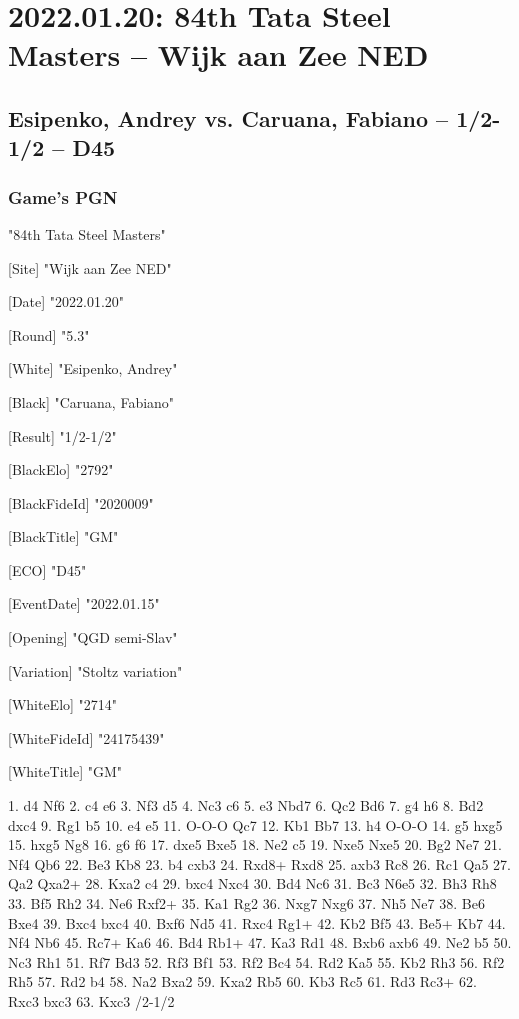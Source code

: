 \documentclass[9pt]{extarticle}
\begin{document}
\section*{2022.01.20: 84th Tata Steel Masters -- Wijk aan Zee NED}

\subsection*{Esipenko, Andrey vs. Caruana, Fabiano -- 1/2-1/2 -- D45}
\subsubsection*{Game's PGN}
\begin{flushleft}
[Event] "84th Tata Steel Masters"

[Site] "Wijk aan Zee NED"

[Date] "2022.01.20"

[Round] "5.3"

[White] "Esipenko, Andrey"

[Black] "Caruana, Fabiano"

[Result] "1/2-1/2"

[BlackElo] "2792"

[BlackFideId] "2020009"

[BlackTitle] "GM"

[ECO] "D45"

[EventDate] "2022.01.15"

[Opening] "QGD semi-Slav"

[Variation] "Stoltz variation"

[WhiteElo] "2714"

[WhiteFideId] "24175439"

[WhiteTitle] "GM"

\end{flushleft}
\begin{flushleft}
1. d4 Nf6 2. c4 e6 3. Nf3 d5 4. Nc3 c6 5. e3 Nbd7 6. Qc2 Bd6 7. g4 h6 8. Bd2 dxc4 9. Rg1 b5 10. e4 e5 11. O-O-O Qc7 12. Kb1 Bb7 13. h4 O-O-O 14. g5 hxg5 15. hxg5 Ng8 16. g6 f6 17. dxe5 Bxe5 18. Ne2 c5 19. Nxe5 Nxe5 20. Bg2 Ne7 21. Nf4 Qb6 22. Be3 Kb8 23. b4 cxb3 24. Rxd8+ Rxd8 25. axb3 Rc8 26. Rc1 Qa5 27. Qa2 Qxa2+ 28. Kxa2 c4 29. bxc4 Nxc4 30. Bd4 Nc6 31. Bc3 N6e5 32. Bh3 Rh8 33. Bf5 Rh2 34. Ne6 Rxf2+ 35. Ka1 Rg2 36. Nxg7 Nxg6 37. Nh5 Ne7 38. Be6 Bxe4 39. Bxc4 bxc4 40. Bxf6 Nd5 41. Rxc4 Rg1+ 42. Kb2 Bf5 43. Be5+ Kb7 44. Nf4 Nb6 45. Rc7+ Ka6 46. Bd4 Rb1+ 47. Ka3 Rd1 48. Bxb6 axb6 49. Ne2 b5 50. Nc3 Rh1 51. Rf7 Bd3 52. Rf3 Bf1 53. Rf2 Bc4 54. Rd2 Ka5 55. Kb2 Rh3 56. Rf2 Rh5 57. Rd2 b4 58. Na2 Bxa2 59. Kxa2 Rb5 60. Kb3 Rc5 61. Rd3 Rc3+ 62. Rxc3 bxc3 63. Kxc3 \quad  {}/2-1/2
\end{flushleft}
\end{document}
